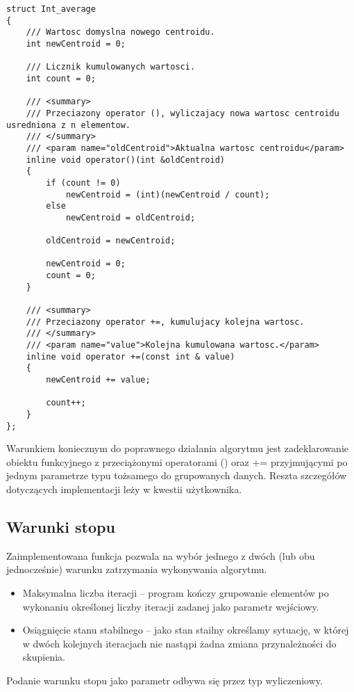 \begin{lstlisting}
struct Int_average
{
	/// Wartosc domyslna nowego centroidu.
	int newCentroid = 0;
	
	/// Licznik kumulowanych wartosci.
	int count = 0;
	
	/// <summary>
	/// Przeciazony operator (), wyliczajacy nowa wartosc centroidu usredniona z n elementow.
	/// </summary>
	/// <param name="oldCentroid">Aktualna wartosc centroidu</param>
	inline void operator()(int &oldCentroid)
	{
		if (count != 0)
			newCentroid = (int)(newCentroid / count);
		else
			newCentroid = oldCentroid;
		
		oldCentroid = newCentroid;
		
		newCentroid = 0;
		count = 0;
	}
	
	/// <summary>
	/// Przeciazony operator +=, kumulujacy kolejna wartosc.
	/// </summary>
	/// <param name="value">Kolejna kumulowana wartosc.</param>
	inline void operator +=(const int & value)
	{
		newCentroid += value;
		
		count++;
	}
};
\end{lstlisting}

Warunkiem koniecznym do poprawnego działania algorytmu jest zadeklarowanie obiektu funkcyjnego z przeciążonymi operatorami () oraz += przyjmującymi po jednym parametrze typu tożsamego do grupowanych danych. Reszta szczegółów dotyczących implementacji leży w kwestii użytkownika.

\subsection{Warunki stopu}\label{stop}

Zaimplementowana funkcja pozwala na wybór jednego z dwóch (lub obu jednocześnie) warunku zatrzymania wykonywania algorytmu.

\begin{itemize}
	\item Maksymalna liczba iteracji -- program kończy grupowanie elementów po wykonaniu określonej liczby iteracji zadanej jako parametr wejściowy.
	\item Osiągnięcie stanu stabilnego -- jako stan stailny określamy sytuację, w której w dwóch kolejnych iteracjach nie nastąpi żadna zmiana przynależności do skupienia.
\end{itemize}

Podanie warunku stopu jako parametr odbywa się przez typ wyliczeniowy.